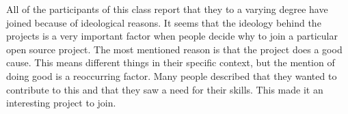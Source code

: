 All of the participants of this class report that they to a varying degree have joined because of ideological reasons. It seems that the ideology behind the projects is a very important factor when people decide why to join a particular open source project. The most mentioned reason is that the project does a good cause. This means different things in their specific context, but the mention of doing good is a reoccurring factor. Many people described that they wanted to contribute to this and that they saw a need for their skills. This made it an interesting project to join.